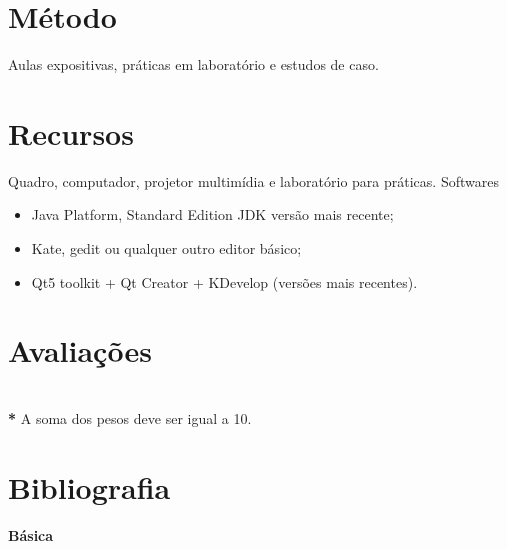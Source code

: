 \documentclass[11pt,a4paper,sans]{moderncv}
\begin{document}
\section{Método}
Aulas expositivas, práticas em laboratório e estudos de caso.

\section{Recursos}
Quadro, computador, projetor multimídia e laboratório para práticas.
Softwares

\begin{itemize}
\item Java Platform, Standard Edition JDK versão mais recente;
\item Kate, gedit ou qualquer outro editor básico;
\item Qt5 toolkit + Qt Creator + KDevelop (versões mais recentes).
\end{itemize}

\section{Avaliações}

\begin{cvcolumns}
\end{cvcolumns}
~\\
\textbf{*} A soma dos pesos deve ser igual a 10.

\section{Bibliografia}

\textbf{Básica}

\begin{cvcolumns}
\end{cvcolumns}
\begin{cvcolumns}
\end{cvcolumns}
\end{document}
